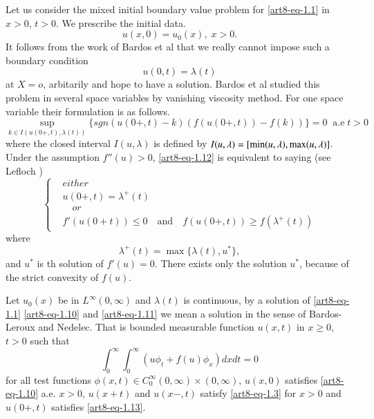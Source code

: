 Let us consider the mixed initial boundary value problem for \eqref{art8-eq-1.1} in $x >0$, $t > 0$. We prescribe the initial data.
\begin{equation}\label{art8-eq-1.10}
u(x, 0) = u_{0}(x), \; x > 0.
\end{equation}
It follows from the work of Bardos et al \cite{art8-key1} that we really cannot impose such a boundary condition
\begin{equation}\label{art8-eq-1.11}
u(0,t)= \lambda(t)
\end{equation}
at $X=o$, arbitarily and hope to have a solution. Bardos et al studied this problem in several space variables by vanishing viscosity method. For one space variable their formulation is as follows.
\begin{equation}\label{art8-eq-1.12}
\sup\limits_{k\in I(u(0+,t), \lambda(t))}\{sgn (u(0+,t)-k)(f(u(0+,t))-f(k))\} =0 \;\; \text{a.e} \;t > 0
\end{equation}
where the closed interval $I(u, \lambda)$ is defined by $I(u, \lambda) = [\min(u, \lambda),\break \max(u, \lambda)]$. Under the assumption $f''(u)> 0$, \eqref{art8-eq-1.12} is equivalent to saying (see Lefloch \cite{art8-key10})
\begin{equation}\label{art8-eq-1.13}
\left\{
\begin{aligned}
& either\\
 & u(0+, t)= \lambda^{+}(t)\\
& \quad {or}\\
 & f'(u(0+t))\leq 0 \quad \text{and}\quad f(u(0+,t))\geq f(\lambda^{+}(t))
\end{aligned}
\right.
\end{equation}
where
\begin{equation}\label{art8-eq-1.14}
\lambda^{+}(t) = \max\{\lambda(t), u^{*}\},
\end{equation}
and $u^{*}$ is th solution of $f'(u) =0$. There exists only the solution $u^{*}$, because of the strict convexity of $f(u)$.

\begin{defi*}
Let $u_{0}(x)$ be in $L^{\infty}(0, \infty)$ and $\lambda(t)$ is continuous, by a solution of \eqref{art8-eq-1.1}
\eqref{art8-eq-1.10} and \eqref{art8-eq-1.11} we mean a solution in the sense of Bardos-Leroux and Nedelec. That is bounded measurable function $u(x,t)$ in $x\geq 0$, $t>0$ such that
\begin{equation}\label{art8-eq-1.15}
\int_{0}^{\infty} \int_{0}^{\infty}(u\phi_{t} + f(u)\phi_{x})dxdt =0
\end{equation}
 for all test functions $\phi(x,t) \in C_{0}^{\infty}(0,\infty) \times (0,\infty)$, $u(x, 0)$ satisfies
\eqref{art8-eq-1.10} a.e. $x>0$, $u(x+t)$ and $u(x-,t)$ satisfy \eqref{art8-eq-1.3} for $x>0$ and $u(0+, t)$ satisfies  \eqref{art8-eq-1.13}.
\end{defi*}

